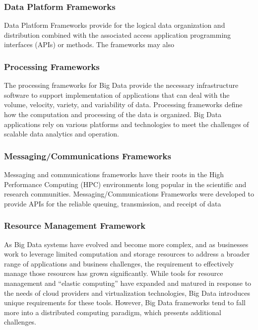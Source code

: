 \documentclass[11pt]{article}
\begin{document}
\subsubsection{Data Platform Frameworks}

Data Platform Frameworks provide for the logical data organization and distribution combined with the 
associated access application programming interfaces (APIs) or methods. The frameworks may also 

\subsubsection{Processing Frameworks}

The processing frameworks for Big Data provide the necessary infrastructure software to support 
implementation of applications that can deal with the volume, velocity, variety, and variability of data. 
Processing frameworks define how the computation and processing of the data is organized. Big Data 
applications rely on various platforms and technologies to meet the challenges of scalable data analytics 
and operation. 

\subsubsection{Messaging/Communications Frameworks}

Messaging and communications frameworks have their roots in the High Performance Computing (HPC) 
environments long popular in the scientific and research communities. Messaging/Communications 
Frameworks were developed to provide APIs for the reliable queuing, transmission, and receipt of data 

\subsubsection{Resource Management Framework}

As Big Data systems have evolved and become more complex, and as businesses work to leverage limited 
computation and storage resources to address a broader range of applications and business challenges, the 
requirement to effectively manage those resources has grown significantly. While tools for resource 
management and “elastic computing” have expanded and matured in response to the needs of cloud 
providers and virtualization technologies, Big Data introduces unique requirements for these tools. 
However, Big Data frameworks tend to fall more into a distributed computing paradigm, which presents 
additional challenges. 
\end{document}
